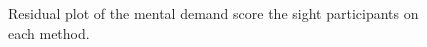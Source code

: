 \begin{figure}[!htb]
\begin{minipage}{0.45\textwidth}
        \caption{Residual plot of the mental demand score the sight participants on each method.}
        \label{fig:residplot_sagat_avg_two_way_sight}
    \end{minipage}
\end{figure}


\FloatBarrier